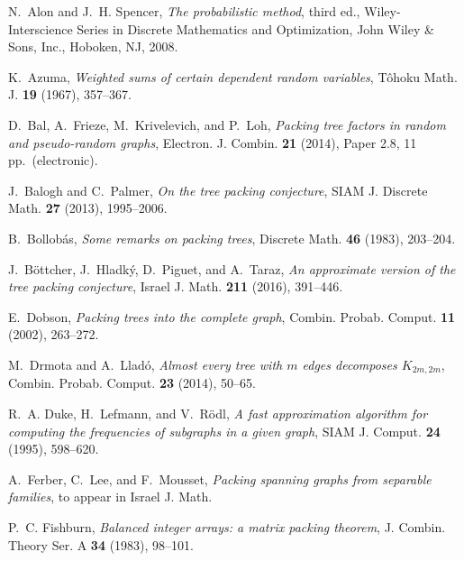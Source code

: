 \documentclass[a4paper, 11pt, reqno]{amsart}
\numberwithin{equation}{section}
\newcommand{\1}{{\rm 1\hspace*{-0.4ex}%
\rule{0.1ex}{1.52ex}\hspace*{0.2ex}}}
\begin{document}
\providecommand{\bysame}{\leavevmode\hbox to3em{\hrulefill}\thinspace}
\providecommand{\MR}{\relax\ifhmode\unskip\space\fi MR }
\providecommand{\MRhref}[2]{%
  \href{http://www.ams.org/mathscinet-getitem?mr=#1}{#2}
}
\providecommand{\href}[2]{#2}
\begin{thebibliography}{10}

N.~Alon and J.~H. Spencer, \emph{The probabilistic method}, third ed.,
  Wiley-Interscience Series in Discrete Mathematics and Optimization, John
  Wiley \& Sons, Inc., Hoboken, NJ, 2008.

K.~Azuma, \emph{Weighted sums of certain dependent random variables}, T\^ohoku
  Math. J. \textbf{19} (1967), 357--367.

D.~Bal, A.~Frieze, M.~Krivelevich, and P.~Loh, \emph{Packing tree factors in
  random and pseudo-random graphs}, Electron. J. Combin. \textbf{21} (2014),
  Paper 2.8, 11 pp.\ (electronic).

J.~Balogh and C.~Palmer, \emph{On the tree packing conjecture}, SIAM J.
  Discrete Math. \textbf{27} (2013), 1995--2006.

B.~Bollob{\'a}s, \emph{Some remarks on packing trees}, Discrete Math.
  \textbf{46} (1983), 203--204.

J.~B{\"o}ttcher, J.~Hladk{\'y}, D.~Piguet, and A.~Taraz, \emph{An approximate
  version of the tree packing conjecture}, Israel J. Math. \textbf{211} (2016),
  391--446.

E.~Dobson, \emph{Packing trees into the complete graph}, Combin. Probab.
  Comput. \textbf{11} (2002), 263--272.

M.~Drmota and A.~Llad{\'o}, \emph{Almost every tree with {$m$} edges decomposes
  {$K_{2m,2m}$}}, Combin. Probab. Comput. \textbf{23} (2014), 50--65.

R.~A. Duke, H.~Lefmann, and V.~R{\"o}dl, \emph{A fast approximation algorithm
  for computing the frequencies of subgraphs in a given graph}, SIAM J. Comput.
  \textbf{24} (1995), 598--620.

A.~Ferber, C.~Lee, and F.~Mousset, \emph{Packing spanning graphs from separable families}, to appear in Israel J. Math.

P.~C. Fishburn, \emph{Balanced integer arrays: a matrix packing theorem}, J.
  Combin. Theory Ser. A \textbf{34} (1983), 98--101.


\end{thebibliography}
\end{document}
